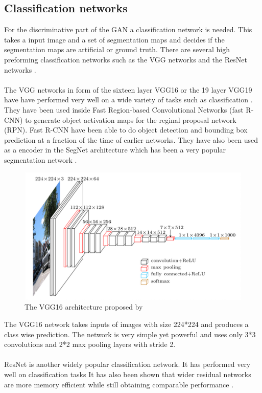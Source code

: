 \documentclass[a4paper,11pt]{article}
\begin{document}
\subsection{Classification networks}
For the discriminative part of the GAN a classification network is needed. This takes a input image and a set of segmentation maps and decides if the segmentation maps are artificial or ground truth. There are several high preforming classification networks such as the VGG networks \cite{simonyan_very_2014} and the ResNet networks \cite{he_deep_2015}.\\
\\
The VGG networks in form of the sixteen layer VGG16 or the 19 layer VGG19 have have performed very well on a wide variety of tasks such as classification \cite{simonyan_very_2014}. They have been used inside Fast Region-based Convolutional Networks (fast R-CNN) \cite{ren_faster_2015, girshick_fast_2015} to generate object activation maps for the reginal proposal network (RPN). Fast R-CNN have been able to do object detection and bounding box prediction at a fraction of the time of earlier networks. They have also been used as a encoder in the SegNet architecture which has been a very popular segmentation network \cite{badrinarayanan_segnet:_2015}.
\begin{figure}[h!]
  \centering
      \includegraphics[scale=0.5]{vgg}
  \caption{The VGG16 architecture proposed by \cite{simonyan_very_2014}} \label{fig:vgg}
\end{figure}
The VGG16 network takes inputs of images with size 224*224 and produces a class wise prediction. The network is very simple yet powerful and uses only 3*3 convolutions and 2*2 max pooling layers with stride 2.\\
\\
ResNet is another widely popular classification network. It has performed very well on classification tasks \cite{he_identity_2016, szegedy_inception-v4_2016} It has also been shown that wider residual networks are more memory efficient while still obtaining comparable performance \cite{wu_wider_2016, zagoruyko_wide_2016}.
\end{document}
